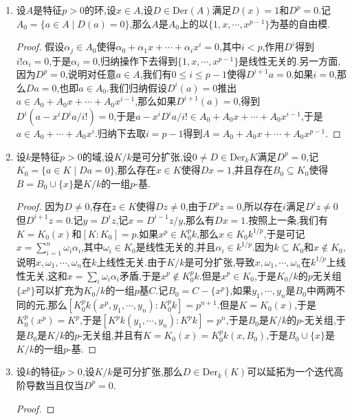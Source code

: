 \begin{enumerate}
\begin{proof}
    	归纳操作下去我们得到满足$D_i'\circ D_0=D_i$的长度无穷的导数$D'$是唯一存在的.接下来设$D^*$是迭代的,设$D^*$和$D'$分别对应的$k$代数同态为$E_t:A\to A[[t]]$和$E_t':B\to B[[t]]$.我们解释过迭代条件就是$E_u\circ E_t=E_{t+u}$.我们要证明的是$E_u'\circ E_t'=E_{t+u}'$.我们来对$m$做归纳,假设$\forall b\in B$有$E_u'(E_t'(b))\equiv E_{t+u}'(b)(\mathrm{mod}(t,u)^{m+1})$.那么有如下实线交换图表,按照$B$在$A$上0-平展得到存在唯一的虚线同态使得图表交换,这说明$E_u'(E_t'(b))\equiv E_{t+u}'(b)(\mathrm{mod}(t,u)^{m+2}),\forall b\in B$成立.于是有$E_u'\circ E_t'=E_{t+u}'$.
    	$$\xymatrix{B\ar[rrrr]^{E_{t+u}'}\ar@{-->}[drrrr]&&&&B[[t,u]]/(t,u)^{m+1}\\A\ar[u]\ar[rr]^{E_{t+u}}&&A[[t,u]]\ar[rr]&&B[[t,u]]/(t,u)^{m+2}\ar[u]}$$
    \end{proof}
    \item 设$A$是特征$p>0$的环,设$x\in A$,设$D\in\mathrm{Der}(A)$满足$D(x)=1$和$D^p=0$.记$A_0=\{a\in A\mid D(a)=0\}$,那么$A$是$A_0$上的以$\{1,x,\cdots,x^{p-1}\}$为基的自由模.
    \begin{proof}
    	
    	假设$\alpha_j\in A_0$使得$\alpha_0+\alpha_1x+\cdots+\alpha_ix^i=0$,其中$i<p$,作用$D^i$得到$i!\alpha_i=0$,于是$\alpha_i=0$,归纳操作下去得到$\{1,x,\cdots,x^{p-1}\}$是线性无关的.另一方面,因为$D^p=0$,说明对任意$a\in A$,我们有$0\le i\le p-1$使得$D^{i+1}a=0$.如果$i=0$,那么$Da=0$,也即$a\in A_0$.我们归纳假设$D^i(a)=0$推出$a\in A_0+A_0x+\cdots+A_0x^{i-1}$,那么如果$D^{i+1}(a)=0$,得到$D^i(a-x^iD^ia/i!)=0$,于是$a-x^iD^ia/i!\in A_0+A_0x+\cdots+A_0x^{i-1}$,于是$a\in A_0+\cdots+A_0x^i$.归纳下去取$i=p-1$得到$A=A_0+A_0x+\cdots+A_0x^{p-1}$.
    \end{proof}
    \item 设$k$是特征$p>0$的域,设$K/k$是可分扩张,设$0\not=D\in\mathrm{Der}_kK$满足$D^p=0$,记$K_0=\{a\in K\mid Da=0\}$,那么存在$x\in K$使得$Dx=1$,并且存在$B_0\subseteq K_0$使得$B=B_0\cup\{x\}$是$K/k$的一组$p$-基.
    \begin{proof}
    	
    	因为$D\not=0$,存在$z\in K$使得$Dz\not=0$,由于$D^pz=0$,所以存在$i$满足$D^iz\not=0$但$D^{i+1}z=0$.记$y=D^iz$,记$x=D^{i-1}z/y$,那么有$Dx=1$.按照上一条,我们有$K=K_0(x)$和$[K:K_0]=p$.如果$x^p\in K_0^pk$,那么$x\in K_0k^{1/p}$,于是可记$x=\sum_{i=1}^n\omega_i\alpha_i$,其中$\omega_i\in K_0$是线性无关的,并且$\alpha_i\in k^{1/p}$.因为$k\subseteq K_0$和$x\not\in K_0$,说明$x,\omega_1,\cdots,\omega_n$在$k$上线性无关.由于$K/k$是可分扩张,导致$x,\omega_1,\cdots,\omega_n$在$k^{1/p}$上线性无关,这和$x=\sum_i\omega_i\alpha_i$矛盾,于是$x^p\not\in K_0^pk$.但是$x^p\in K_0$,于是$K_0/k$的$p$无关组$\{x^p\}$可以扩充为$K_0/k$的一组$p$基$C$.记$B_0=C-\{x^p\}$,如果$y_1,\cdots,y_n$是$B_0$中两两不同的元,那么$[K_0^pk(x^p,y_1,\cdots,y_n):K_0^pk]=p^{n+1}$.但是$K=K_0(x)$,于是$K_0^p(x^p)=K^p$,于是$[K^pk(y_1,\cdots,y_n):K^pk]=p^n$,于是$B_0$是$K/k$的$p$-无关组,于是$B_0$是$K/k$的$p$-无关组,并且有$K=K_0(x)=K_0^pk(x,B_0)$,于是$B_0\cup\{x\}$是$K/k$的一组$p$-基.
    \end{proof}
    \item 设$k$的特征$p>0$,设$K/k$是可分扩张,那么$D\in\mathrm{Der}_k(K)$可以延拓为一个迭代高阶导数当且仅当$D^p=0$.
    \begin{proof}
    	

\end{proof}
\end{enumerate}
